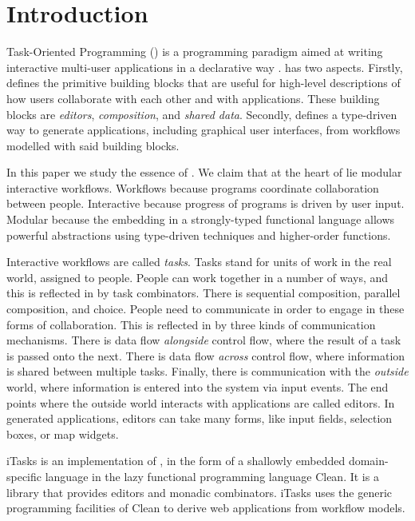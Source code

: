 


\section{Introduction}

Task-Oriented Programming (\TOP) is a programming paradigm aimed at writing interactive multi-user applications in a declarative way \cite{conf/ppdp/PlasmeijerLMAK12}.
\TOP has two aspects.
Firstly, \TOP defines the primitive building blocks that are useful for high-level descriptions of how users collaborate with each other and with applications.
These building blocks are \emph{editors}, \emph{composition}, and \emph{shared data}.
Secondly, \TOP defines a type-driven way to generate applications, including graphical user interfaces, from workflows modelled with said building blocks.

In this paper we study the essence of \TOP.
We claim that at the heart of \TOP lie modular interactive workflows.
Workflows because \TOP programs coordinate collaboration between people.
Interactive because progress of \TOP programs is driven by user input.
Modular because the embedding in a strongly-typed functional language allows powerful abstractions using type-driven techniques and higher-order functions.

Interactive workflows are called \emph{tasks}.
Tasks stand for units of work in the real world, assigned to people.
People can work together in a number of ways, and this is reflected in \TOP by task combinators.
There is sequential composition, parallel composition, and choice.
People need to communicate in order to engage in these forms of collaboration.
This is reflected in \TOP by three kinds of communication mechanisms.
There is data flow \emph{alongside} control flow, where the result of a task is passed onto the next.
There is data flow \emph{across} control flow, where information is shared between multiple tasks.
Finally, there is communication with the \emph{outside} world, where information is entered into the system via input events.
The end points where the outside world interacts with \TOP applications are called editors.
In generated applications, editors can take many forms, like input fields, selection boxes, or map widgets.

iTasks is an implementation of \TOP, in the form of a shallowly embedded domain-specific language in the lazy functional programming language Clean.
It is a library that provides editors and monadic combinators.
iTasks uses the generic programming facilities of Clean to derive web applications from workflow models.

